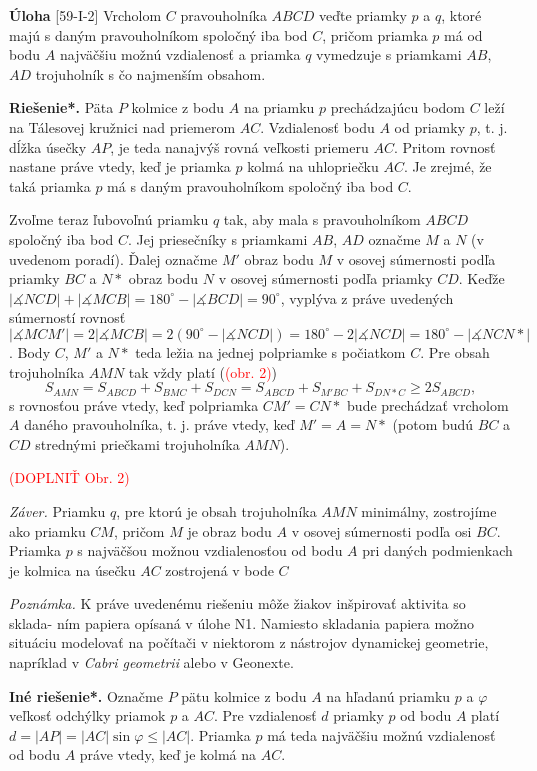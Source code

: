 \documentclass{article}
\newcommand{\rieh}{\textbf{Riešenie*.} }
\newcommand{\ma}{\measuredangle}
\newcommand\todo[1]{\noindent\textcolor{red}{(#1)}}
\newcommand{\problem}[3]{
  \begin{tcolorbox}[breakable,notitle,boxrule=0pt,colback=light-gray,colframe=light-gray]
    \textbf{Úloha}
    [#1] #2
  \end{tcolorbox}
  \noindent#3
}
\begin{document}
\problem{59-I-2}{
Vrcholom $C$ pravouholníka $ABCD$ veďte priamky $p$ a $q$, ktoré majú s daným pravouholníkom spoločný iba bod $C$, pričom priamka $p$ má od bodu $A$ najväčšiu možnú
vzdialenosť a priamka $q$ vymedzuje s priamkami $AB$, $AD$ trojuholník s čo najmenším obsahom. 
}{
\rieh Päta $P$ kolmice z bodu $A$ na priamku $p$ prechádzajúcu bodom $C$ leží na
Tálesovej kružnici nad priemerom $AC$. Vzdialenosť bodu $A$ od priamky $p$, t. j. dĺžka úsečky $AP$, je teda nanajvýš rovná veľkosti priemeru $AC$. Pritom rovnosť nastane práve vtedy, keď je priamka $p$ kolmá na uhlopriečku $AC$. Je zrejmé, že taká priamka $p$ má s daným pravouholníkom spoločný iba bod $C$.

Zvoľme teraz ľubovoľnú priamku $q$ tak, aby mala s pravouholníkom $ABCD$ spoločný iba bod $C$. Jej priesečníky s priamkami $AB$, $AD$ označme $M$ a $N$ (v uvedenom poradí). Ďalej označme $M'$ obraz bodu $M$ v osovej súmernosti podľa priamky $BC$ a $N*$ obraz bodu $N$ v osovej súmernosti podľa priamky $CD$. Keďže $|\ma NCD| + |\ma MCB|= 180^\circ- |\ma BCD| = 90^\circ$, vyplýva z práve uvedených súmerností rovnosť $|\ma MCM'| = 2|\ma MCB| = 2(90^\circ - |\ma NCD|) = 180^\circ - 2|\ma NCD| = 180^\circ - |\ma NCN* |$. Body $C$, $M'$ a $N*$ teda ležia na jednej polpriamke s počiatkom $C$. Pre obsah trojuholníka $AMN$
tak vždy platí (\todo{obr. 2})
$$S_{AMN}= S_{ABCD} + S_{BMC} + S_{DCN} = S_{ABCD} + S_{M'BC} + S_{DN*C} \geq 2S_{ABCD},$$
s rovnosťou práve vtedy, keď polpriamka $CM'= CN*$ bude prechádzať vrcholom $A$ daného pravouholníka, t. j. práve vtedy, keď $M'= A = N*$ (potom budú $BC$ a $CD$ strednými priečkami trojuholníka $AMN$).

\todo{DOPLNIŤ Obr. 2}

\textit{Záver.} Priamku $q$, pre ktorú je obsah trojuholníka $AMN$ minimálny, zostrojíme
ako priamku $CM$, pričom $M$ je obraz bodu $A$ v osovej súmernosti podľa osi $BC$.
Priamka $p$ s najväčšou možnou vzdialenosťou od bodu $A$ pri daných podmienkach
je kolmica na úsečku $AC$ zostrojená v bode $C$

\textit{Poznámka.} K práve uvedenému riešeniu môže žiakov inšpirovať aktivita so sklada-
ním papiera opísaná v úlohe N1. Namiesto skladania papiera možno situáciu modelovať
na počítači v niektorom z nástrojov dynamickej geometrie, napríklad v \textit{Cabri geometrii} alebo v {Geonexte}.

\textbf{Iné riešenie*.} Označme $P$ pätu kolmice z bodu $A$ na hľadanú priamku $p$ a $\varphi$ veľkosť odchýlky priamok $p$ a $AC$. Pre vzdialenosť $d$ priamky $p$ od bodu $A$ platí $d = |AP| = |AC| \sin \varphi \leq |AC|$. Priamka $p$ má teda najväčšiu možnú vzdialenosť od bodu $A$ práve vtedy, keď je kolmá na $AC$.

}
\end{document}
